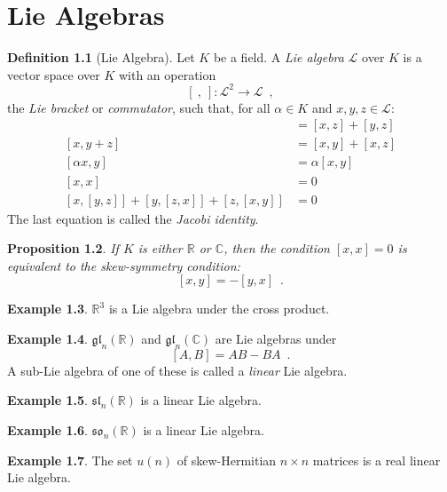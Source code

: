 \documentclass{book}
\newtheorem{prop}{Proposition}[chapter]
\theoremstyle{definition}
\newtheorem{df}[prop]{Definition}
\newtheorem{ex}[prop]{Example}
\newcommand{\gl}[2]{\ensuremath{\mathfrak{gl}_{#1} \left( {#2} \right)}}
\renewcommand{\sl}[2]{\ensuremath{\mathfrak{sl}_{#1} \left( {#2} \right)}}
\newcommand{\so}[2]{\ensuremath{\mathfrak{so}_{#1} \left( {#2} \right)}}
\begin{document}
\chapter{Lie Algebras}

\begin{df}[Lie Algebra]
Let $K$ be a field. A \emph{Lie algebra} $\mathcal{L}$ over $K$ is a vector space over $K$ with an operation
\[ [\ ,\ ] : \mathcal{L}^2 \rightarrow \mathcal{L} \enspace , \]
the \emph{Lie bracket} or \emph{commutator}, such that, for all $\alpha \in K$ and $x,y,z \in \mathcal{L}$:
\begin{align*}
[x+y,z] & = [x,z] + [y,z] \\
[x,y+z] & = [x,y] + [x,z] \\
[\alpha x,y] & = \alpha [x,y] \\
[x,x] & = 0 \\
[x,[y,z]] + [y,[z,x]] + [z,[x,y]] & = 0
\end{align*}
The last equation is called the \emph{Jacobi identity}.
\end{df}

\begin{prop}
If $K$ is either $\mathbb{R}$ or $\mathbb{C}$, then the condition $[x,x] = 0$ is equivalent to the \emph{skew-symmetry condition}:
\[ [x,y] = -[y,x] \enspace . \]
\end{prop}


\begin{ex}
$\mathbb{R}^3$ is a Lie algebra under the cross product.
\end{ex}

\begin{ex}
$\gl
{n}{\mathbb{R}}$ and $\gl{n}{\mathbb{C}}$ are Lie algebras under
\[ [A,B] = AB - BA \enspace . \]
A sub-Lie algebra of one of these is called a \emph{linear} Lie algebra.
\end{ex}

\begin{ex}
$\sl{n}{\mathbb{R}}$ is a linear Lie algebra.
\end{ex}

\begin{ex}
$\so{n}{\mathbb{R}}$ is a linear Lie algebra.
\end{ex}

\begin{ex}
The set $u(n)$ of skew-Hermitian $n \times n$ matrices is a real linear Lie algebra.
\end{ex}
\end{document}
